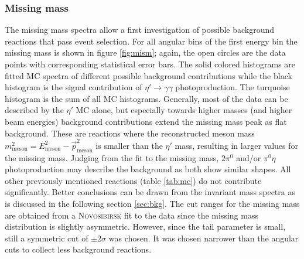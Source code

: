  \subsubsection{Missing mass}
 The missing mass spectra allow a first investigation of possible background reactions that pass event selection. For all angular bins of the first energy bin the missing mass is shown in figure \ref{fig:mism}; again, the open circles are the data points with corresponding statistical error bars. The solid colored histograms are fitted MC spectra of different possible background contributions while the black histogram is the signal contribution of $\eta'\to\gamma\gamma$ photoproduction. The turquoise histogram is the sum of all MC histograms. Generally, most of the data can be described by the $\eta'$ MC alone, but especially towards higher masses (and higher beam energies) background contributions extend the missing mass peak as flat background. These are reactions where the reconstructed meson mass $m_\text{meson}^2=E_\text{meson}^2-\vec{p}_\text{meson}^2$ is smaller than the $\eta'$ mass, resulting in larger values for the missing mass. Judging from the fit to the missing mass, $2\pi^0$ and/or $\pi^0\eta$ photoproduction may describe the background as both show similar shapes. All other previously mentioned reactions (table \ref{tab:mc}) do not contribute significantly. Better conclusions can be drawn from the invariant mass spectra as is discussed in the following section \ref{sec:bkg}. The cut ranges for the missing mass are obtained from a \textsc{Novosibirsk} \cite{nov} fit to the data since the missing mass distribution is slightly asymmetric. However, since the tail parameter is small, still a symmetric cut of $\pm2\sigma$ was chosen. It was chosen narrower than the angular cuts to collect less background reactions.
